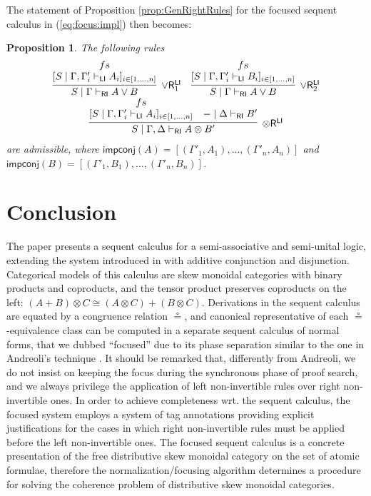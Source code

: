 \documentclass[submission,copyright,creativecommons]{eptcs}
\newtheorem{proposition}[theorem]{Proposition}
\theoremstyle{definition}
\newcommand{\tr}{\otimes \mathsf{R}}
\newcommand{\orrone}{\lor \mathsf{R}_{1}}
\newcommand{\orrtwo}{\lor \mathsf{R}_{2}}
\newcommand{\ot}{\otimes}
\newcommand{\RI}{\mathsf{RI}}
\newcommand{\LI}{\mathsf{LI}}
\newcommand{\impconj}[1]{\mathsf{impconj} (#1)}
\newcommand\niccolo[1]{\mbox{}
{\marginpar{\color{red}NV}}
{\sf\noindent\color{red}#1}}%
\begin{document}
The statement of Proposition \ref{prop:GenRightRules} for the focused sequent calculus in (\ref{eq:focus:impl}) then becomes:
\begin{proposition}\label{prop:GenRightRules:impl}
  The following rules
  \begin{displaymath}
    \begin{array}{c}
      \infer[\orrone^{\LI}]{S \mid \Gamma \vdash_{\RI} A \lor B}{
        \deduce{[S \mid \Gamma , \Gamma'_i \vdash_{\LI} A_i]_{i \in [1 , \dots , n]}}{fs}
      }
      \quad
      \infer[\orrtwo^{\LI}]{S \mid \Gamma \vdash_{\RI} A \lor B}{
        \deduce{[S \mid \Gamma , \Gamma'_i \vdash_{\LI} B_i]_{i \in [1 , \dots , n]}}{fs}
      }
      \\
      \infer[\tr^{\LI}]{S \mid \Gamma , \Delta \vdash_{\RI} A \ot B'}{
        \deduce{[S \mid \Gamma , \Gamma'_i \vdash_{\LI} A_i]_{i \in [1 , \dots , n]}}{fs}
        &
        - \mid \Delta \vdash_{\RI} B'
      }
    \end{array}
  \end{displaymath}
  are admissible, where
  $\impconj{A} = [(\Gamma'_1 , A_1) , \dots , (\Gamma'_n , A_n)]$ and $\impconj{B} = [(\Gamma'_1 , B_1) , \dots , (\Gamma'_n , B_n)]$.
\end{proposition}

\section{Conclusion}
The paper presents a sequent calculus for a semi-associative and semi-unital logic,  extending the system introduced in \cite{uustalu:sequent:2021} with additive conjunction and disjunction. Categorical models of this calculus are skew monoidal categories with binary products and coproducts, and the tensor product preserves coproducts on the left: $(A + B) \ot C \cong (A \ot C) + (B \ot C)$.
Derivations in the sequent calculus are equated by a congruence relation $\circeq$, and canonical representative of each $\circeq$-equivalence class can be computed in a separate sequent calculus of normal forms, that we dubbed ``focused'' due to its phase separation similar to the one in Andreoli's technique \cite{andreoli:logic:1992}.  It should be remarked that, differently from Andreoli, we do not insist on keeping the focus during the synchronous phase of proof search, and we always privilege the application of left non-invertible rules over right non-invertible ones. In order to achieve completeness wrt. the sequent calculus, the focused system employs a system of tag annotations providing explicit justifications for the cases in which right non-invertible rules must be applied before the left non-invertible ones.
The focused sequent calculus is a concrete presentation of the free distributive skew monoidal category on the set of atomic formulae, therefore the normalization/focusing algorithm determines a procedure for solving the coherence problem of distributive skew monoidal categories.
\end{document}
